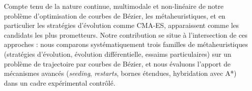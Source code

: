 Compte tenu de la nature continue, multimodale et non-linéaire de notre
problème d'optimisation de courbes de Bézier, les métaheuristiques, et en
particulier les stratégies d'évolution comme CMA-ES, apparaissent comme les
candidats les plus prometteurs.  Notre contribution se situe à l'intersection
de ces approches : nous comparons systématiquement trois familles de
métaheuristiques (stratégies d'évolution, évolution différentielle, essaims
particulaires) sur un problème de trajectoire par courbes de Bézier, et nous
évaluons l'apport de mécanismes avancés (\textit{seeding}, \textit{restarts},
bornes étendues, hybridation avec A*) dans un cadre expérimental contrôlé.
